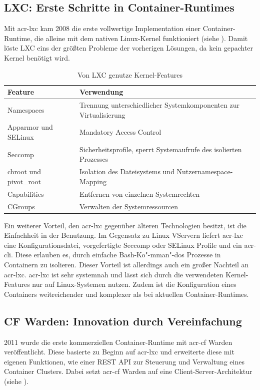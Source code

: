 \subsection{LXC: Erste Schritte in Container-Runtimes}
\label{sec:geschichteLXC}
Mit \gls{acr-lxc} kam 2008 die erste vollwertige Implementation einer Container-Runtime, die alleine mit dem nativen Linux-Kernel funktioniert (siehe ). Damit löste LXC eins der größten Probleme der vorherigen Lösungen, da kein gepachter Kernel benötigt wird.

\begin{table}[h]
		\begin{tabu} to 
			\toprule
			Feature & Verwendung\\
			\midrule
			Namespaces & Trennung unterschiedlicher Systemkomponenten zur Virtualisierung\\
			Apparmor und SELinux & Mandatory Access Control\\
			Seccomp & Sicherheitsprofile, sperrt Systemaufrufe des isolierten Prozesses\\
			chroot und pivot\_root & Isolation des Dateisystems und Nutzernamespace-Mapping\\
			Capabilities & Entfernen von einzelnen Systemrechten\\
			CGroups & Verwalten der Systemressourcen\\
			\bottomrule
		\end{tabu}
	\caption{Von LXC genutze Kernel-Features \citep{Lxc7LinuxManualPage}}
	\label{tab:lxcKernel}
\end{table}

Ein weiterer Vorteil, den \gls{acr-lxc} gegenüber älteren Technologien besitzt, ist die Einfachheit in der Benutzung. Im Gegensatz zu Linux VServern liefert \gls{acr-lxc} eine Konfigurationsdatei, vorgefertigte Seccomp oder SELinux Profile und ein \gls{acr-cli}. Diese erlauben es, durch einfache Bash-Ko"-mman"-dos Prozesse in Containern zu isolieren. Dieser Vorteil ist allerdings auch ein großer Nachteil an \gls{acr-lxc}. \gls{acr-lxc} ist sehr systemnah und lässt sich durch die verwendeten Kernel-Features nur auf Linux-Systemen nutzen. Zudem ist die Konfiguration eines Containers weitreichender und komplexer als bei aktuellen Container-Runtimes.

\subsection{CF Warden: Innovation durch Vereinfachung}
\label{sec:geschichteCFWarden}
2011 wurde die erste kommerziellen Container-Runtime mit \gls{acr-cf} Warden veröffentlicht. Diese basierte zu Beginn auf \gls{acr-lxc} und erweiterte diese mit eigenen Funktionen, wie einer REST API zur Steuerung und Verwaltung eines Container Clusters. Dabei setzt \gls{acr-cf} Warden auf eine Client-Server-Architektur (siehe ). 

